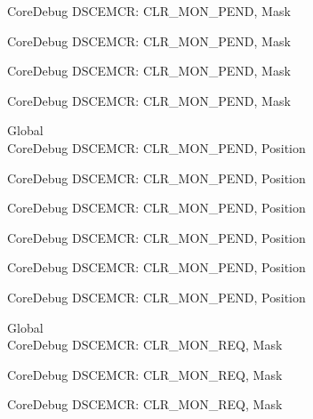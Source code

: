 \begin{DoxyRefList}
\label{deprecated__deprecated000627}%
%
Core\+Debug DSCEMCR\+: CLR\+\_\+\+MON\+\_\+\+PEND, Mask 

\label{deprecated__deprecated000752}%
%
Core\+Debug DSCEMCR\+: CLR\+\_\+\+MON\+\_\+\+PEND, Mask 

\label{deprecated__deprecated001203}%
%
Core\+Debug DSCEMCR\+: CLR\+\_\+\+MON\+\_\+\+PEND, Mask 

\label{deprecated__deprecated001305}%
%
Core\+Debug DSCEMCR\+: CLR\+\_\+\+MON\+\_\+\+PEND, Mask  
\item[Global \doxylink{group___c_m_s_i_s___s_c_b_ga2295235d9c595bd6f287728f4c395bbf}{Core\+Debug\+\_\+\+DSCEMCR\+\_\+\+CLR\+\_\+\+MON\+\_\+\+PEND\+\_\+\+Pos} ]\hfill \\
\label{deprecated__deprecated000073}%
%
Core\+Debug DSCEMCR\+: CLR\+\_\+\+MON\+\_\+\+PEND, Position 

\label{deprecated__deprecated000524}%
%
Core\+Debug DSCEMCR\+: CLR\+\_\+\+MON\+\_\+\+PEND, Position 

\label{deprecated__deprecated000626}%
%
Core\+Debug DSCEMCR\+: CLR\+\_\+\+MON\+\_\+\+PEND, Position 

\label{deprecated__deprecated000751}%
%
Core\+Debug DSCEMCR\+: CLR\+\_\+\+MON\+\_\+\+PEND, Position 

\label{deprecated__deprecated001202}%
%
Core\+Debug DSCEMCR\+: CLR\+\_\+\+MON\+\_\+\+PEND, Position 

\label{deprecated__deprecated001304}%
%
Core\+Debug DSCEMCR\+: CLR\+\_\+\+MON\+\_\+\+PEND, Position  
\item[Global \doxylink{group___c_m_s_i_s___s_c_b_gaea36b8cede2cc1184176eb20b7bd0f8d}{Core\+Debug\+\_\+\+DSCEMCR\+\_\+\+CLR\+\_\+\+MON\+\_\+\+REQ\+\_\+\+Msk} ]\hfill \\
\label{deprecated__deprecated000072}%
%
Core\+Debug DSCEMCR\+: CLR\+\_\+\+MON\+\_\+\+REQ, Mask 

\label{deprecated__deprecated000523}%
%
Core\+Debug DSCEMCR\+: CLR\+\_\+\+MON\+\_\+\+REQ, Mask 

\label{deprecated__deprecated000625}%
%
Core\+Debug DSCEMCR\+: CLR\+\_\+\+MON\+\_\+\+REQ, Mask 


\end{DoxyRefList}
